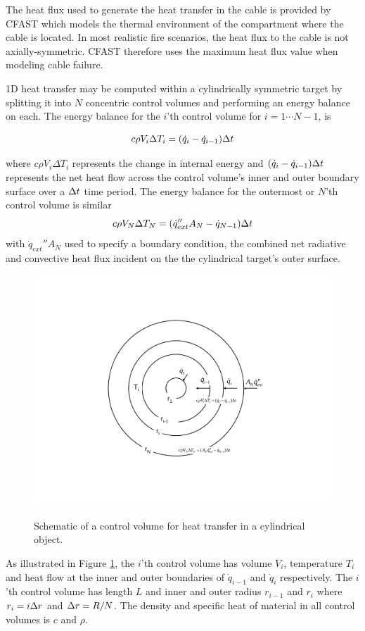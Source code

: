 The heat flux used to generate the heat transfer in the cable is provided
by CFAST which models the thermal environment of the compartment where
the cable is located.  In most realistic fire  scenarios, the heat flux
to the cable is not axially-symmetric.  CFAST therefore uses the maximum
heat flux value when modeling cable failure.

1D heat transfer may be computed within a cylindrically symmetric target
by splitting it into $N$ concentric control volumes and performing
an energy balance on each.  The energy balance for the $i$'th control
volume for $i=1\cdots N-1$, is

\begin{equation}
c\rho V_i\Delta T_i=(\dot{q}_i-\dot{q}_{i-1})\Delta t
\label{eq:cylheat1}
\end{equation}

\noindent where $c\rho V_i\Delta T_i$ represents the change in internal
energy
and $(\dot{q}_i-\dot{q}_{i-1})\Delta t$ represents the net heat flow across the
control volume's inner and outer boundary surface over a $\Delta t$ time period.
The energy balance for the outermost or $N$'th control volume is similar
\begin{equation}
c\rho V_N\Delta T_N=(\dot{q}_{ext}''A_N-\dot{q}_{N-1})\Delta t
\label{eq:cylheat2}
\end{equation}
with $\dot{q}_{ext}''A_N$ used to specify a boundary condition,
the combined net radiative and convective heat flux incident
on the the cylindrical target's outer surface.

\begin{figure}[h]
\begin{center}
\includegraphics[width=5.0in]{FIGURES/Theory/cylheat}\\
\end{center}
\caption{Schematic of a control volume for heat transfer in a cylindrical object.}
 \label{fig:cylheat}
\end{figure}
As illustrated in Figure \ref{fig:cylheat}, the $i$'th control volume has
volume $V_i$, temperature $T_i$ and heat flow at the inner
and outer boundaries of $\dot{q}_{i-1}$ and $\dot{q}_i$ respectively.
The $i$'th control volume has length $L$ and inner and outer radius
$r_{i-1}$ and $r_i$ where $r_i=i\Delta r$ and $\Delta r=R/N$.
The density and specific heat of material in all control volumes is
$c$ and $\rho$.

